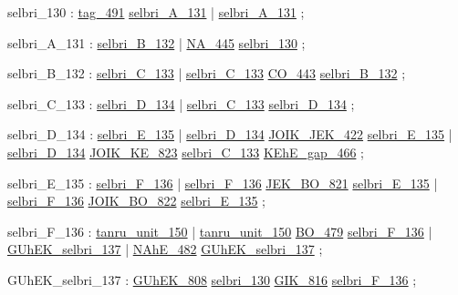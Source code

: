 \label{html:y130}
selbri_130              :  \hyperref[html:y491]{tag_491}  \hyperref[html:y131]{selbri_A_131}
                        |  \hyperref[html:y131]{selbri_A_131}
                        ;

\label{html:y131}
selbri_A_131            :  \hyperref[html:y132]{selbri_B_132}
                        |  \hyperref[html:y445]{NA_445}  \hyperref[html:y130]{selbri_130}
                        ;

\label{html:y132}
selbri_B_132            :  \hyperref[html:y133]{selbri_C_133}
                        |  \hyperref[html:y133]{selbri_C_133}  \hyperref[html:y443]{CO_443}  \hyperref[html:y132]{selbri_B_132}
                        ;

\label{html:y133}
selbri_C_133            :  \hyperref[html:y134]{selbri_D_134}
                        |  \hyperref[html:y133]{selbri_C_133}  \hyperref[html:y134]{selbri_D_134}
                        ;

\label{html:y134}
selbri_D_134            :  \hyperref[html:y135]{selbri_E_135}
                        |  \hyperref[html:y134]{selbri_D_134}  \hyperref[html:y422]{JOIK_JEK_422}  \hyperref[html:y135]{selbri_E_135}
                        |  \hyperref[html:y134]{selbri_D_134}  \hyperref[html:y823]{JOIK_KE_823}  \hyperref[html:y133]{selbri_C_133}
                                \hyperref[html:y466]{KEhE_gap_466}
                        ;

\label{html:y135}
selbri_E_135            :  \hyperref[html:y136]{selbri_F_136}
                        |  \hyperref[html:y136]{selbri_F_136}  \hyperref[html:y821]{JEK_BO_821}  \hyperref[html:y135]{selbri_E_135}
                        |  \hyperref[html:y136]{selbri_F_136}  \hyperref[html:y822]{JOIK_BO_822}  \hyperref[html:y135]{selbri_E_135}
                        ;

\label{html:y136}
selbri_F_136            :  \hyperref[html:y150]{tanru_unit_150}
                        |  \hyperref[html:y150]{tanru_unit_150}  \hyperref[html:y479]{BO_479}  \hyperref[html:y136]{selbri_F_136}
                        |  \hyperref[html:y137]{GUhEK_selbri_137}
                        |  \hyperref[html:y482]{NAhE_482}  \hyperref[html:y137]{GUhEK_selbri_137}
                        ;

\label{html:y137}
GUhEK_selbri_137        :  \hyperref[html:y808]{GUhEK_808}  \hyperref[html:y130]{selbri_130}  \hyperref[html:y816]{GIK_816}  \hyperref[html:y136]{selbri_F_136}
                        ;

